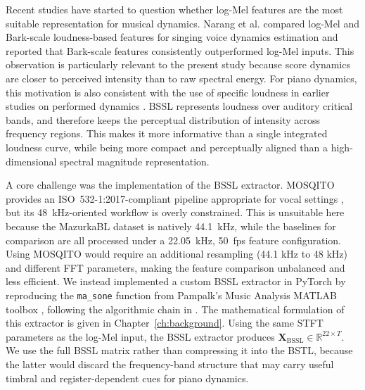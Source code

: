Recent studies have started to question whether log-Mel features are the most suitable representation for musical dynamics. Narang et al. \cite{narang2024automatic} compared log-Mel and Bark-scale loudness-based features for singing voice dynamics estimation and reported that Bark-scale features consistently outperformed log-Mel inputs. This observation is particularly relevant to the present study because score dynamics are closer to perceived intensity than to raw spectral energy. For piano dynamics, this motivation is also consistent with the use of specific loudness in earlier studies on performed dynamics \cite{kosta2016mapping}. BSSL represents loudness over auditory critical bands, and therefore keeps the perceptual distribution of intensity across frequency regions. This makes it more informative than a single integrated loudness curve, while being more compact and perceptually aligned than a high-dimensional spectral magnitude representation.

A core challenge was the implementation of the BSSL extractor. MOSQITO \cite{san2021mosqito} provides an ISO~532-1:2017-compliant pipeline \cite{iso532_1_2017} appropriate for vocal settings \cite{narang2024automatic}, but its 48~kHz-oriented workflow is overly constrained. This is unsuitable here because the MazurkaBL dataset is natively 44.1~kHz, while the baselines for comparison are all processed under a 22.05~kHz, 50~fps feature configuration. Using MOSQITO would require an additional resampling (44.1 kHz to 48 kHz) and different FFT parameters, making the feature comparison unbalanced and less efficient. We instead implemented a custom BSSL extractor in PyTorch by reproducing the \texttt{ma\_sone} function from Pampalk's Music Analysis MATLAB toolbox \cite{pampalk2004toolbox}, following the algorithmic chain in \cite{pampalk2002content}. The mathematical formulation of this extractor is given in Chapter~\ref{ch:background}. Using the same STFT parameters as the log-Mel input, the BSSL extractor produces $\mathbf{X}_{\mathrm{BSSL}} \in \mathbb{R}^{22 \times T}$. We use the full BSSL matrix rather than compressing it into the BSTL, because the latter would discard the frequency-band structure that may carry useful timbral and register-dependent cues for piano dynamics.

